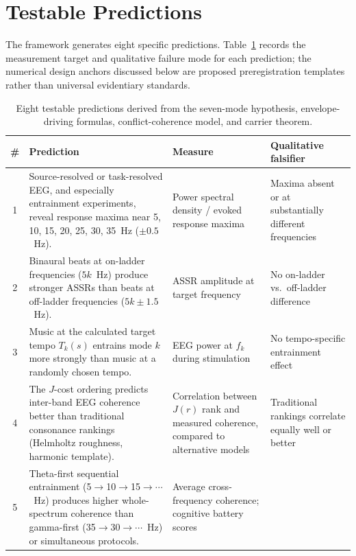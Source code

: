 \documentclass[11pt,a4paper]{article}
\begin{document}
\section{Testable Predictions}
\label{sec:predictions}

The framework generates eight specific predictions. Table~\ref{tab:predictions}
records the measurement target and qualitative failure mode for each
prediction; the numerical design anchors discussed below are proposed
preregistration templates rather than universal evidentiary standards.

\begin{table}[H]
\centering
\small
\caption{Eight testable predictions derived from the seven-mode hypothesis,
envelope-driving formulas, conflict-coherence model, and carrier theorem.}
\label{tab:predictions}
\begin{tabular}{@{}c>{\raggedright\arraybackslash}p{5.2cm}>{\raggedright\arraybackslash}p{3.2cm}>{\raggedright\arraybackslash}p{3.5cm}@{}}
\toprule
\# & Prediction & Measure & Qualitative falsifier \\
\midrule
1 & Source-resolved or task-resolved EEG, and especially entrainment
    experiments, reveal response maxima near 5, 10, 15, 20, 25, 30,
    35~Hz ($\pm 0.5$~Hz).
  & Power spectral density / evoked response maxima
  & Maxima absent or at substantially different frequencies \\[6pt]
2 & Binaural beats at on-ladder frequencies ($5k$~Hz) produce
    stronger ASSRs than beats at off-ladder frequencies
    ($5k \pm 1.5$~Hz).
  & ASSR amplitude at target frequency
  & No on-ladder vs.\ off-ladder difference \\[6pt]
3 & Music at the calculated target tempo $T_k(s)$ entrains mode
    $k$ more strongly than music at a randomly chosen tempo.
  & EEG power at $f_k$ during stimulation
  & No tempo-specific entrainment effect \\[6pt]
4 & The $J$-cost ordering predicts inter-band EEG coherence better
    than traditional consonance rankings (Helmholtz roughness,
    harmonic template).
  & Correlation between $J(r)$ rank and measured coherence, compared
    to alternative models
  & Traditional rankings correlate equally well or better \\[6pt]
5 & Theta-first sequential entrainment (5$\to$10$\to$15$\to\cdots$~Hz)
    produces higher whole-spectrum coherence than gamma-first
    (35$\to$30$\to\cdots$~Hz) or simultaneous protocols.
  & Average cross-frequency coherence; cognitive battery scores

\end{tabular}
\end{table}
\end{document}
